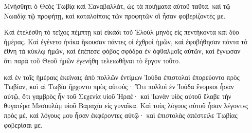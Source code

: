 {\par }{\PP {}Μνήσθητι ὁ Θεὸς Τωβίᾳ καὶ Σαναβαλλάτ, ὡς τὰ ποιήματα αὐτοῦ ταῦτα, καὶ τῷ Νωαδίᾳ τῷ προφήτῃ, καὶ καταλοίποις τῶν προφητῶν οἳ ἦσαν φοβερίζοντές με.
\par }{\PP {}Καὶ ἐτελέσθη τὸ τεῖχος πέμπτῃ καὶ εἰκάδι τοῦ Ἐλοὺλ μηνὸς εἰς πεντήκοντα καὶ δύο ἡμέρας.
Καὶ ἐγένετο ἡνίκα ἤκουσαν πάντες οἱ ἐχθροὶ ἡμῶν, καὶ ἐφοβήθησαν πάντα τὰ ἔθνη τὰ κύκλῳ ἡμῶν, καὶ ἐπέπεσε φόβος σφόδρα ἐν ὀφθαλμοῖς αὐτῶν, καὶ ἔγνωσαν ὅτι παρὰ τοῦ Θεοῦ ἡμῶν ἐγενήθη τελειωθῆναι τὸ ἔργον τοῦτο.
\par }{\PP {}καὶ ἐν ταῖς ἡμέραις ἐκείναις ἀπὸ πολλῶν ἐντίμων Ἰούδα ἐπιστολαὶ ἐπορεύοντο πρὸς Τωβίαν, καὶ αἱ Τωβία ἤρχοντο πρὸς αὐτούς·
Ὅτι πολλοὶ ἐν Ἰούδα ἔνορκοι ἦσαν αὐτῷ, ὅτι γαμβρὸς ἦν τοῦ Σεχενία υἱοῦ Ἡραέ· καὶ Ἰωνὰν υἱὸς αὐτοῦ ἔλαβε τὴν θυγατέρα Μεσουλὰμ υἱοῦ Βαραχία εἰς γυναῖκα.
Καὶ τοὺς λόγους αὐτοῦ ἦσαν λέγοντες πρὸς μὲ, καὶ λόγους μου ἦσαν ἐκφέροντες αὐτῷ· καὶ ἐπιστολὰς ἀπέστειλε Τωβίας φοβερίσαι με.

}

